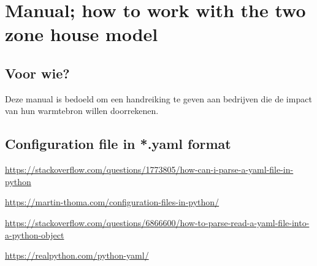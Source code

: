 \section{Manual; how to work with the two zone house model}

\subsection{Voor wie?}
Deze manual is bedoeld om een handreiking te geven aan bedrijven die de impact van hun warmtebron willen doorrekenen.

\subsection{Configuration file in *.yaml format}

\url{https://stackoverflow.com/questions/1773805/how-can-i-parse-a-yaml-file-in-python}

\url{https://martin-thoma.com/configuration-files-in-python/}

\url{https://stackoverflow.com/questions/6866600/how-to-parse-read-a-yaml-file-into-a-python-object}

\url{https://realpython.com/python-yaml/}

\newpage
